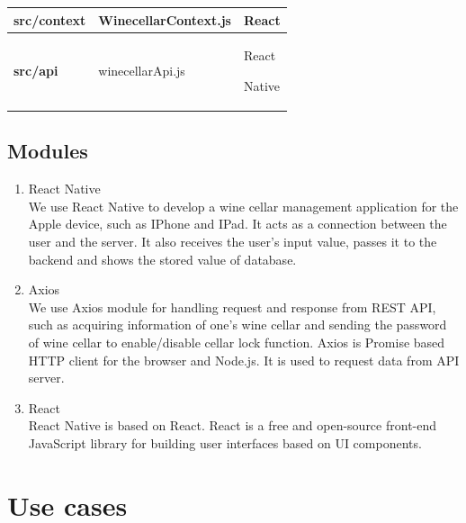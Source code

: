 \documentclass[sigconf, nonacm]{acmart}
\begin{document}
\begin {enumerate}
\begin{table}[ht!]
\begin{center}
\begin{tabular}{|p{2.7cm}|p{3.4cm}|p{1.3cm}|}
        \textbf{src/context} & WinecellarContext.js & React\\
        \hline
        
        \textbf{src/api} & winecellarApi.js & React \par Native\\
        \hline
        
        \end{tabular}
    \end{center}
\end{table}

    \subsection{Modules}
    \begin{enumerate}
        \item React Native\\
        We use React Native to develop a wine cellar management application for the Apple device, such as IPhone and IPad. It acts as a connection between the user and the server. It also receives the user’s input value, passes it to the backend and shows the stored value of database. 
        \item Axios\\
        We use Axios module for handling request and response from REST API, such as acquiring information of one's wine cellar and sending the password of wine cellar to enable/disable cellar lock function. Axios is Promise based HTTP client for the browser and Node.js. It is used to request data from API server.
        \item React\\
        React Native is based on React. 
        React is a free and open-source front-end JavaScript library for building user interfaces based on UI components. 
    \end{enumerate}
    
\section{Use cases}

\end{enumerate}
\end{document}
